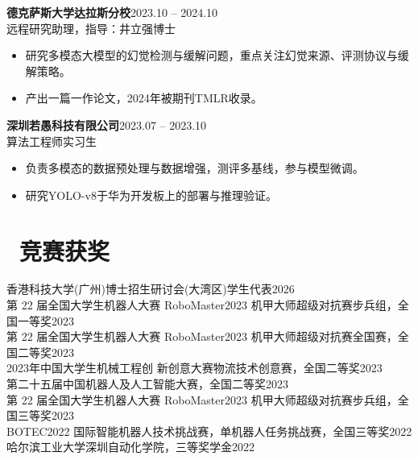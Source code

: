 \documentclass[10pt,a4paper,fontset=fandol]{ctexart}
\newcommand{\project}[4]{
  \textbf{#1}\hfill #2\\
  {\small #3}
  \begin{itemize}
    #4
  \end{itemize}
}
\newcommand{\award}[2]{#1\hfill #2\\}
\begin{document}
\project{德克萨斯大学达拉斯分校}{2023.10 -- 2024.10}
{远程研究助理，指导：井立强博士}
{
  \item 研究多模态大模型的幻觉检测与缓解问题，重点关注幻觉来源、评测协议与缓解策略。
  \item 产出一篇一作论文，2024年被期刊TMLR收录。
}
\vspace{0.12em}

\project{深圳若愚科技有限公司}{2023.07 -- 2023.10}
{算法工程师实习生}
{
  \item 负责多模态的数据预处理与数据增强，测评多基线，参与模型微调。
  \item 研究YOLO-v8于华为开发板上的部署与推理验证。
}
\vspace{0.12em}

\section{\texorpdfstring{{\normalfont\faTrophy}\ 竞赛获奖}{竞赛获奖}}
\vspace{0.12em}
\award{香港科技大学(广州)博士招生研讨会(大湾区)学生代表}{2026}
\award{第 22 届全国大学生机器人大赛 RoboMaster2023 机甲大师超级对抗赛步兵组，全国一等奖}{2023}
\award{第 22 届全国大学生机器人大赛 RoboMaster2023 机甲大师超级对抗赛全国赛，全国二等奖}{2023}
\award{2023年中国大学生机械工程创
新创意大赛物流技术创意赛，全国二等奖}{2023}
\award{第二十五届中国机器人及人工智能大赛，全国二等奖}{2023}
\award{第 22 届全国大学生机器人大赛 RoboMaster2023 机甲大师超级对抗赛步兵组，全国三等奖}{2023}
\award{BOTEC2022 国际智能机器人技术挑战赛，单机器人任务挑战赛，全国三等奖}{2022}
\award{哈尔滨工业大学深圳自动化学院，三等奖学金}{2022}
\end{document}
